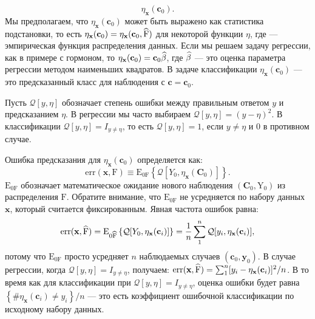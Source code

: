 \begin{equation}
\eta_{\textbf{x}}(\textbf{c}_{0}).
\end{equation}
Мы предполагаем, что $\eta_{\textbf{x}}(\textbf{c}_{0})$ может быть выражено как статистика подстановки, то есть  $\eta_{\textbf{x}}(\textbf{c}_{0}) = \eta_{\textbf{x}}(\textbf{c}_{0}, \widehat{\text{F}})$ для некоторой функции $\eta$, где  --- эмпирическая функция распределения данных. Если мы решаем задачу регрессии, как в примере с гормоном, то $\eta_{\textbf{x}}(\textbf{c}_{0}) = \textbf{c}_{0} \widehat{\beta}$, где $\widehat{\beta}$ --- это оценка параметра регрессии методом наименьших квадратов. В задаче классификации $\eta_{\textbf{x}}(\textbf{c}_{0})$ --- это предсказанный класс для наблюдения с $\textbf{c} = \textbf{c}_{0}$.

Пусть $\mathcal{Q}[y, \eta]$ обозначает степень ошибки между правильным ответом $y$ и предсказанием $\eta$. В регрессии мы часто выбираем $\mathcal{Q}[y, \eta] = (y - \eta)^{2}$. В классификации $\mathcal{Q}[y, \eta] = I_{y \neq \eta}$, то есть $\mathcal{Q}[y, \eta] = 1$, если $y \neq \eta$ и $0$ в противном случае.

Ошибка предсказания для $\eta_{\textbf{x}}(\textbf{c}_{0})$ определяется как:
\begin{equation}
\text{err}(\textbf{x}, \text{F}) \equiv \mathrm{E}_{0\text{F}} \left \{ \mathcal{Q}[Y_{0}, \eta_{\textbf{x}}(\textbf{C}_{0})] \right \}.
\end{equation}
$\mathrm{E}_{0\text{F}}$ обозначает математическое ожидание нового наблюдения $(\textbf{C}_{0}, \text{Y}_{0})$ из распределения $\text{F}$. Обратите внимание, что $\mathrm{E}_{0\text{F}}$ не усредняется по набору данных $\mathbf{x}$, который считается фиксированным. Явная частота ошибок равна:
\begin{equation}
\text{err}(\textbf{x}, \widehat{\text{F}}) = \mathrm{E}_{0\widehat{\text{F}}} \left \{ \mathcal{Q}[Y_{0}, \eta_{\textbf{x}}(\textbf{c}_{i})] \right \} = \frac{1}{n} \sum_{1}^{n}  \mathcal{Q}[y_{i}, \eta_{\textbf{x}}(\textbf{c}_{i})],
\end{equation}
потому что $\mathrm{E}_{0\text{F}}$ просто усредняет $n$ наблюдаемых случаев $(\textbf{c}_{0}, \textbf{y}_{0})$. В случае регрессии, когда $\mathcal{Q}[y, \eta] = I_{y \neq \eta}$,  получаем: $ \text{err}(\textbf{x}, \widehat{\text{F}}) = \sum_{1}^{n} [y_{i} - \eta_{\mathbf{x}}(\mathbf{c}_{i})]^{2} / n $. В то время как для классификации при $\mathcal{Q}[y, \eta] = I_{y \neq \eta}$, оценка ошибки будет равна $ \left \{ \#{\eta_{\textbf{x}}(\textbf{c}_{i}) \neq y_{i}}\right \}/n$ --- это есть коэффициент ошибочной классификации по исходному набору данных.

